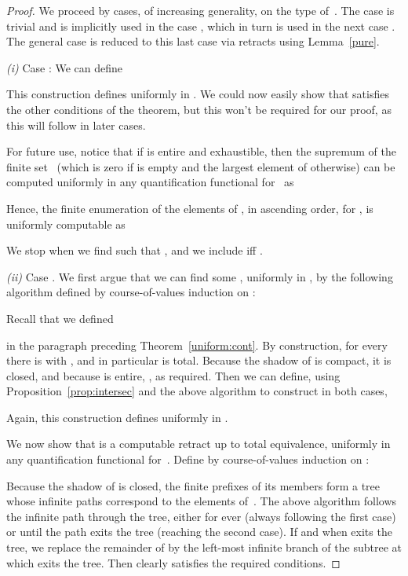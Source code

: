 \documentclass{LMCS}
\begin{document}
\pagebreak[3] 
\begin{proof}
  We proceed by cases, of increasing generality, on the type of~.
  The case  is trivial and is implicitly used in the
  case , which in turn is used in the next
  case . The general case  is
  reduced to this last case via retracts using Lemma~\ref{pure}.

\medskip

\emph{(i)} Case : We can define

This construction defines  uniformly in
. We could now easily show that  satisfies the other
conditions of the theorem, but this won't be required for our proof,
as this will follow in later cases.

\medskip

For future use, notice that if  is entire and
exhaustible, then the supremum of the finite set~ (which is zero
if  is empty and the largest element of  otherwise) can be
computed uniformly in any quantification functional for~ as
 
Hence, the finite enumeration  of
the elements of , in ascending order, 
for , is
uniformly computable as

We stop when we find  such that , and we include
 iff .

\medskip

\emph{(ii)}  Case .
We first argue that we can find some , uniformly in
, by the following algorithm defined by course-of-values
induction on :

Recall that we defined 

in the paragraph preceding Theorem~\ref{uniform:cont}.  By
construction, for every  there is  with , and in particular  is total.  Because the shadow of
 is compact, it is closed, and because  is entire, , as required.  Then we can define, using
Proposition~\ref{prop:intersec} and the above algorithm to construct
 in both cases,

Again,
this construction defines  uniformly in .

\medskip

We now show that  is a computable retract up to total equivalence,
uniformly in any quantification functional for~.  Define  by course-of-values induction
on :

Because the shadow of  is closed, the finite prefixes of its
members form a tree whose infinite paths correspond to the elements
of~. 
The above algorithm follows the infinite path  through the
tree, either for ever (always following the first case) or until the
path exits the tree (reaching the second case). If and when 
exits the tree, we replace the remainder of  by the left-most
infinite branch of the subtree at which  exits the tree. Then
 clearly satisfies the required conditions.  


\end{proof}
\end{document}
